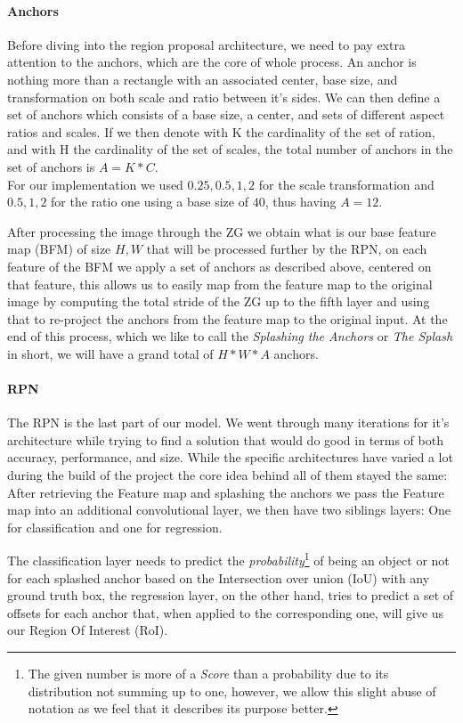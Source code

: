 \documentclass[10pt,journal,cspaper,compsoc]{IEEEtran}
\begin{document}
   \paragraph*{Anchors}
    Before diving into the region proposal architecture, we need to pay extra attention to the anchors, which are the core of whole process. An anchor is nothing more than a rectangle with an associated center, base size, and transformation on both scale and ratio between it's sides. We can then define a set of anchors which consists of a base size, a center, and sets of different 
   aspect ratios and scales. If we then denote with K the cardinality of the set of ration, and with H the cardinality of the set of scales, the total number of anchors in the set of anchors is $A = K * C$. \\
   For our implementation we used ${0.25, 0.5, 1, 2}$ for the scale transformation and ${0.5, 1, 2}$ for the ratio one using a base size of $40$, thus having $A = 12$.

   After processing the image through the ZG we obtain what is our base feature map (BFM) of size $H, W$ that will be processed further by the RPN, on each feature of the BFM we apply a set of anchors as described above, centered on that feature, this allows us to easily map from the feature map to the original image by computing the total stride of the ZG up to the fifth layer and using that to re-project the anchors from the feature map to the original input.
   At the end of this process, which we like to call the \emph{Splashing the Anchors} or \emph{The Splash} in short, we will have a grand total of $H*W*A$ anchors.
  \paragraph*{RPN}
    The RPN is the last part of our model. We went through many iterations for it's architecture while trying to find a solution that would do good in terms of both accuracy, performance, and size. While the specific architectures have varied a lot during the build of the project the core idea behind all of them stayed the same: After retrieving the Feature map and splashing the anchors we pass the Feature map into an additional convolutional layer,
    we then have two siblings layers: One for classification and one for regression. 
    
    The classification layer needs to predict the \emph{probability}\footnote{The given number is more of a \emph{Score} than a probability due to its distribution not summing up to one, however, we allow this slight abuse of notation as we feel that it describes its purpose better.} of being an object or not for each splashed anchor based on the Intersection over union (IoU) with any ground truth box, the regression layer, on the other hand, tries to predict a set of offsets for each anchor that, when applied to the corresponding one, will give us our Region Of Interest (RoI).
\end{document}
